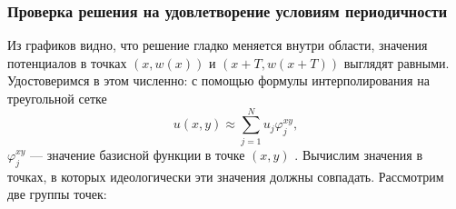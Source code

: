 \documentclass[12pt, a4paper]{article}
\renewcommand{\phi}{\varphi}
\begin{document}
			\subsubsection{Проверка решения на удовлетворение условиям периодичности}
			
				Из графиков видно, что решение гладко меняется внутри области, значения потенциалов в точках
				$(x, w(x))$ и $(x + T, w(x + T))$ выглядят равными. Удостоверимся в этом численно: с помощью формулы интерполирования на треугольной сетке 
				\begin{equation*}
					u(x, y) \approx \sum_{j = 1}^{N} u_{j} \phi_{j}^{xy}, 
				\end{equation*}
				$\phi_{j}^{xy}$ --- значение базисной функции в точке $(x, y)$ \cite{Galanin}.
				Вычислим значения в точках, в которых идеологически эти значения должны совпадать. 
				Рассмотрим две группы точек:
\end{document}

